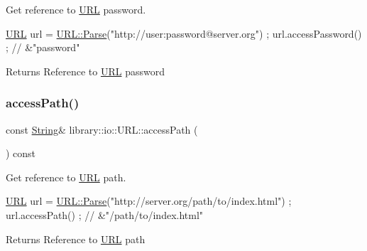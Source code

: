 Get reference to \hyperlink{classlibrary_1_1io_1_1_u_r_l}{U\+RL} password. 


\begin{DoxyCode}
\hyperlink{classlibrary_1_1io_1_1_u_r_l_a7e9c070138a6dbd000ffb10b7cd8a5c4}{URL} url = \hyperlink{classlibrary_1_1io_1_1_u_r_l_a98cf42141cf75e1dd5362eb208a1e2bd}{URL::Parse}(\textcolor{stringliteral}{"http://user:password@server.org"}) ;
url.accessPassword() ; \textcolor{comment}{// &"password"}
\end{DoxyCode}


\begin{DoxyReturn}{Returns}
Reference to \hyperlink{classlibrary_1_1io_1_1_u_r_l}{U\+RL} password 
\end{DoxyReturn}
\mbox{\label{classlibrary_1_1io_1_1_u_r_l_af96de0a8db715a3c1a09f9466db974b2}} 
\subsubsection{\texorpdfstring{access\+Path()}{accessPath()}}
{\footnotesize\ttfamily const \hyperlink{namespacelibrary_1_1io_a7469b45835a4421045db344d6a5a1f85}{String}\& library\+::io\+::\+U\+R\+L\+::access\+Path (\begin{DoxyParamCaption}{ }\end{DoxyParamCaption}) const}



Get reference to \hyperlink{classlibrary_1_1io_1_1_u_r_l}{U\+RL} path. 


\begin{DoxyCode}
\hyperlink{classlibrary_1_1io_1_1_u_r_l_a7e9c070138a6dbd000ffb10b7cd8a5c4}{URL} url = \hyperlink{classlibrary_1_1io_1_1_u_r_l_a98cf42141cf75e1dd5362eb208a1e2bd}{URL::Parse}(\textcolor{stringliteral}{"http://server.org/path/to/index.html"}) ;
url.accessPath() ; \textcolor{comment}{// &"/path/to/index.html"}
\end{DoxyCode}


\begin{DoxyReturn}{Returns}
Reference to \hyperlink{classlibrary_1_1io_1_1_u_r_l}{U\+RL} path 
\end{DoxyReturn}
\mbox{\label{classlibrary_1_1io_1_1_u_r_l_aabb9d2750f3c51c103bd68f899821eba}} 
